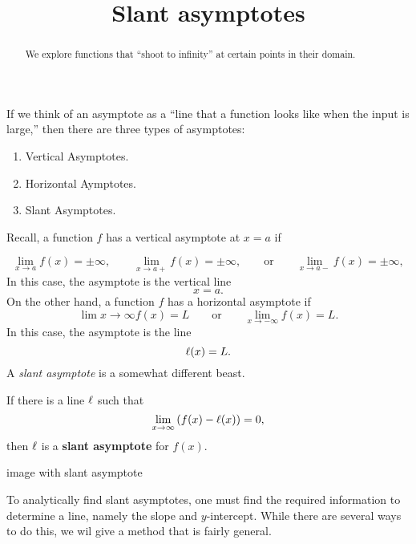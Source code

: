 \documentclass{ximera}
\title[Dig-In:]{Slant asymptotes}
\begin{document}
\begin{abstract}
We explore functions that ``shoot to infinity'' at certain points in
their domain.
\end{abstract}
\maketitle

If we think of an asymptote as a ``line that a function looks like
when the input is large,'' then there are three types of asymptotes:
\begin{enumerate}
\item Vertical Asymptotes.
\item Horizontal Aymptotes.
\item Slant Asymptotes.
\end{enumerate}

Recall, a function $f$ has a vertical asymptote at $x=a$ if

\[
\lim_{x\to a} f(x) = \pm\infty, \qquad \lim_{x\to a+} f(x) = \pm\infty, \qquad\text{or}\qquad \lim_{x\to a-} f(x) = \pm\infty,
\]
In this case, the asymptote is the vertical line
\[
x = a.
\]
On the other hand, a function $f$ has a horizontal asymptote if
\[
\lim{x\to \infty} f(x) = L \qquad\text{or}\qquad \lim_{x\to -\infty}
f(x) = L.
\]
In this case, the asymptote is the line
\[
\ell(x) = L.
\]
A \textit{slant asymptote} is a somewhat different beast.

\begin{definition}
  If there is a line $\ell$ such that
  \[
  \lim_{x\to \infty}\left(f(x) - \l(x)\right) = 0,
  \]
  then $\ell$ is a \textbf{slant asymptote} for $f(x)$.
\end{definition}
\begin{question}
  image with slant asymptote
\end{question}

To analytically find slant asymptotes, one must find the required
information to determine a line, namely the slope and $y$-intercept.
While there are several ways to do this, we wil give a method that is
fairly general. 
\end{document}
